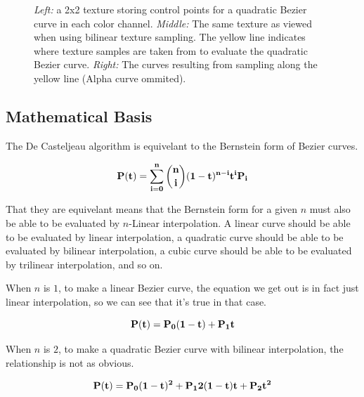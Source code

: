 \documentclass{jcgt}
\begin{document}
\begin{figure}
    \caption{\textit{Left:} a 2x2 texture storing control points for a quadratic Bezier curve in each color channel.  \textit{Middle:} The same texture as viewed when using bilinear texture sampling.  The yellow line indicates where texture samples are taken from to evaluate the quadratic Bezier curve. \textit{Right:} The curves resulting from sampling along the yellow line (Alpha curve ommited).}   
    \label{fig:texbilcurve}
  \end{figure}  

\subsection{Mathematical Basis}

The De Casteljeau algorithm is equivelant to the Bernstein form of Bezier curves.

\begin{equation}
\bf{P(t)} = \sum\limits_{i=0}^n\binom {n} {i}(1-t)^{n-i}t^i\text{\bf{P}}_i
\label{eqn:bernsteinform}
\end{equation}

That they are equivelant means that the Bernstein form for a given $n$ must also be able to be evaluated by $n$-Linear interpolation.  A linear curve should be able to be evaluated by linear interpolation, a quadratic curve should be able to be evaluated by bilinear interpolation, a cubic curve should be able to be evaluated by trilinear interpolation, and so on.

When $n$ is $1$, to make a linear Bezier curve, the equation we get out is in fact just linear interpolation, so we can see that it's true in that case.

\begin{equation}
\bf{P(t)} = P_0(1-t) + P_1t
\label{eqn:bernsteinformn1}
\end{equation}

When $n$ is $2$, to make a quadratic Bezier curve with bilinear interpolation, the relationship is not as obvious.

\begin{equation}
\bf{P(t)} = P_0(1-t)^2 + P_12(1-t)t + P_2t^2
\label{eqn:bernsteinformn2}
\end{equation}
\end{document}
